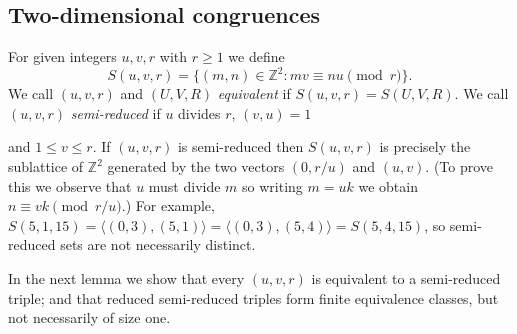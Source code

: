 \documentclass[12pt, a4paper,  reqno, english]{amsart}%
\numberwithin{equation}{section}
\newcommand{\Z}{\mathbb{Z}}
\theoremstyle{definition}
\renewcommand{\leq}{\leqslant}
\renewcommand{\geq}{\geqslant}
\newcommand{\tcom}[1]{{\color{green}{#1}} }
\begin{document}
\subsection{Two-dimensional congruences}
For given integers $u,v,r$ with $r\geq 1$ we define
\[
S(u,v,r)=\{ (m,n)\in \Z^2: mv\equiv nu \pmod r\}.
\]
We call $(u,v,r)$ and $(U,V,R)$ \emph{equivalent} if $S(u,v,r)=S(U,V,R)$.
We call $(u,v,r)$ \emph{semi-reduced} if $u$ divides $r$, $(v,u)=1$   {and $1\leq v\leq r$.
If $(u,v,r)$ is semi-reduced then $S(u,v,r)$ is precisely the sublattice of $\Z^2$ generated by the two vectors $(0,r/u)$ and $(u,v)$.
(To prove this we observe that $u$ must divide $m$ so writing $m=uk$ we obtain $n\equiv vk\pmod {r/u}$.)
For example, $S(5,1,15)=\langle  (0,3), (5,1) \rangle =\langle  (0,3), (5,4) \rangle =S(5,4,15)$, so semi-reduced sets are not necessarily distinct.

In the next lemma we show that every $(u,v,r)$ is equivalent to a semi-reduced triple; and that
 reduced semi-reduced triples form finite equivalence classes, but not necessarily of size one.








}
\end{document}
